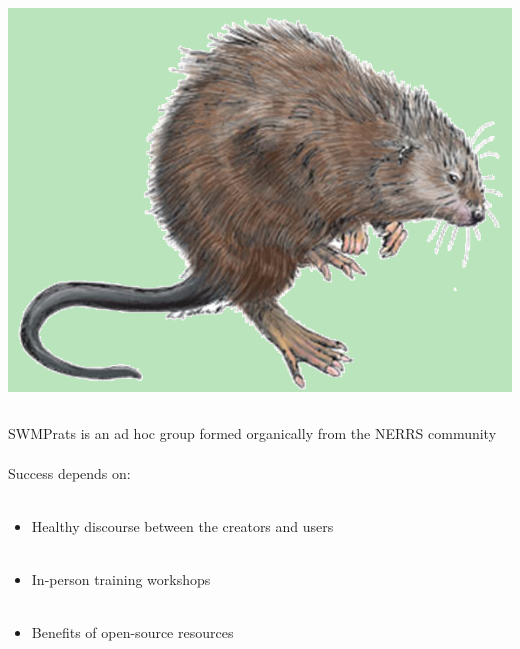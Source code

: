 \documentclass[serif]{beamer}\usepackage[]{graphicx}\usepackage[]{color}
\begin{document}
\begin{frame}[t, fragile]{\includegraphics[width=0.05\paperwidth]{fig/muskrat.png}\hspace{0.07in}{\bf Continuing work and engagement}}
\begin{columns}
\begin{column}{0.53\textwidth}
\centerline{}
\end{column}
\begin{column}{0.43 \textwidth}
\centerline{}
\end{column}
\end{columns}
\vspace{0.2in}
SWMPrats is an ad hoc group formed organically from the NERRS community \\~\\
Success depends on:\\~\\
\begin{itemize}
\item Healthy discourse between the creators and users \\~\\
\item In-person training workshops\\~\\
\item Benefits of open-source resources
\end{itemize}
\end{frame}
\end{document}
